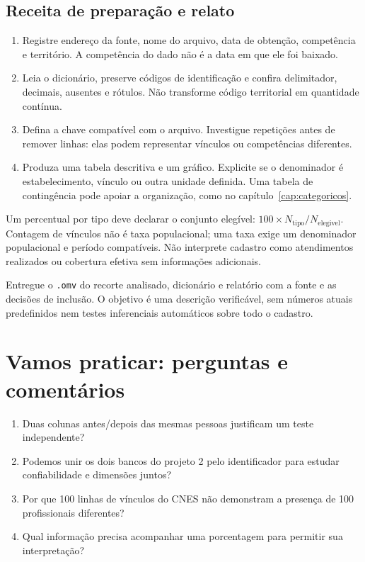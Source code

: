 \subsection{Receita de preparação e relato}

\begin{enumerate}
  \item Registre endereço da fonte, nome do arquivo, data de obtenção, competência e território. A competência do dado não é a data em que ele foi baixado.
  \item Leia o dicionário, preserve códigos de identificação e confira delimitador, decimais, ausentes e rótulos. Não transforme código territorial em quantidade contínua.
  \item Defina a chave compatível com o arquivo. Investigue repetições antes de remover linhas: elas podem representar vínculos ou competências diferentes.
  \item Produza uma tabela descritiva e um gráfico. Explicite se o denominador é estabelecimento, vínculo ou outra unidade definida. Uma tabela de contingência pode apoiar a organização, como no capítulo~\ref{cap:categoricos}.
\end{enumerate}

Um percentual por tipo deve declarar o conjunto elegível: $100\times N_{\mathrm{tipo}}/N_{\mathrm{elegivel}}$. Contagem de vínculos não é taxa populacional; uma taxa exige um denominador populacional e período compatíveis. Não interprete cadastro como atendimentos realizados ou cobertura efetiva sem informações adicionais.

Entregue o \texttt{.omv} do recorte analisado, dicionário e relatório com a fonte e as decisões de inclusão. O objetivo é uma descrição verificável, sem números atuais predefinidos nem testes inferenciais automáticos sobre todo o cadastro.

\section{Vamos praticar: perguntas e comentários}

\begin{enumerate}
  \item Duas colunas antes/depois das mesmas pessoas justificam um teste independente?
  \item Podemos unir os dois bancos do projeto 2 pelo identificador para estudar confiabilidade e dimensões juntos?
  \item Por que 100 linhas de vínculos do CNES não demonstram a presença de 100 profissionais diferentes?
  \item Qual informação precisa acompanhar uma porcentagem para permitir sua interpretação?
\end{enumerate}

